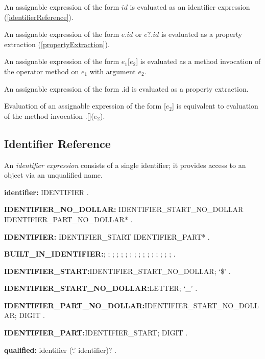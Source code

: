 \documentclass{article}
\newcommand{\code}[1]{{\sf #1}}
\begin{document}
\LMHash{}
An assignable expression of the form $id$ is evaluated as an identifier expression (\ref{identifierReference}).


\LMHash{}
An assignable expression of the form $e.id$ or $e?.id$ is evaluated as a property extraction  (\ref{propertyExtraction}).

\LMHash{}
An assignable expression of the form \code{$e_1$[$e_2$]} is evaluated as a method invocation of the operator method \code{[]} on $e_1$ with argument $e_2$.

\LMHash{}
An assignable expression of the form \code{\SUPER{}.id}  is evaluated as a property extraction.

\LMHash{}
Evaluation of an assignable expression of the form \code{\SUPER{}[$e_2$]} is equivalent to evaluation of the method invocation  \code{\SUPER{}.[]($e_2$)}.

\subsection{ Identifier Reference}

\LMHash{}
An {\em identifier expression} consists of a single identifier; it provides access to an object via an unqualified name.

\begin{grammar}
{\bf identifier:}
      IDENTIFIER
    .

{\bf IDENTIFIER\_NO\_DOLLAR:}
      IDENTIFIER\_START\_NO\_DOLLAR IDENTIFIER\_PART\_NO\_DOLLAR*
    .

{\bf IDENTIFIER:}
      IDENTIFIER\_START IDENTIFIER\_PART*
    .

{\bf BUILT\_IN\_IDENTIFIER:}\ABSTRACT{};
      \AS{};
      \COVARIANT{};
      \DEFERRED{};
      \DYNAMIC{};
      \EXPORT{};
      \EXTERNAL{};
      \FACTORY{};
      \GET{};
      \IMPLEMENTS{};
      \IMPORT{};
      \LIBRARY{};
      \OPERATOR{};
      \PART{};
      \SET{};
      \STATIC{};
      \TYPEDEF{}
    .

 {\bf IDENTIFIER\_START:}IDENTIFIER\_START\_NO\_DOLLAR;
      `\$'
    .

{\bf IDENTIFIER\_START\_NO\_DOLLAR:}LETTER;
      `\_'
    .

{\bf  IDENTIFIER\_PART\_NO\_DOLLAR:}IDENTIFIER\_START\_NO\_DOLLAR;
      DIGIT
    .

{\bf IDENTIFIER\_PART:}IDENTIFIER\_START;
      DIGIT
    .

{\bf qualified:}
      identifier (`{\escapegrammar .}' identifier)?
    .
\end{grammar}
\end{document}
